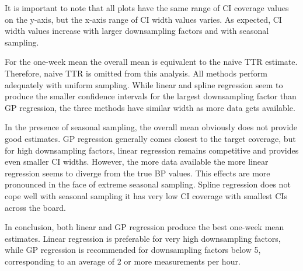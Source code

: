 It is important to note that all plots have the same range of CI coverage values
on the y-axis, but the x-axis range of CI width values varies. As expected,
CI width values increase with larger downsampling factors and with seasonal sampling.

For the one-week mean the overall mean is equivalent to the naive TTR estimate.
Therefore, naive TTR is omitted from this analysis.
All methods perform adequately with uniform sampling.
While linear and spline regression seem to produce the smaller
confidence intervals for
the largest downsampling factor than GP regression, the three methods have
similar width as more data gets available.

In the presence of seasonal sampling, the overall mean obviously does not
provide good estimates. GP regression generally
comes closest to the target coverage, but for high downsampling factors,
linear regression remains competitive and provides even smaller CI widths.
However, the more data available the more linear regression seems to
diverge from the true BP values. This effects are more pronounced in the face
of extreme seasonal sampling. Spline regression does not cope well with seasonal
sampling it has very low CI coverage with smallest CIs across the board.

In conclusion, both linear and GP regression produce the best one-week mean estimates.
Linear regression is preferable for very high downsampling factors,
while GP regression is recommended for downsampling factors below 5,
corresponding to an average of 2 or more measurements per hour.

